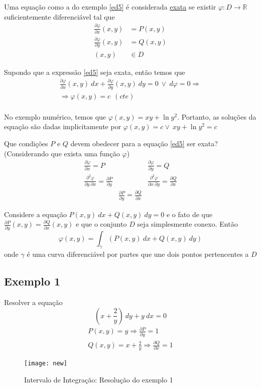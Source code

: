 \documentclass[12pt,openany, letterpaper]{book}
\newcommand{\defini}[3][\mathds{R}]{#2: #3 \rightarrow {#1}}
\newcommand{\DS}{\displaystyle{}}
\begin{document}
{{Uma equação como a do exemplo \ref{ed5} é considerada \underline{exata} se existir $\defini{\varphi}{D}$ suficientemente diferenciável tal que \begin{align*}
    \frac{\partial \varphi}{\partial x}(x,y) &= P(x,y) \\
    \frac{\partial \varphi}{\partial y}(x,y) &= Q(x,y) \\
        (x,y) &\in D
\end{align*}

Supondo que a expressão \ref{ed5} seja exata,  então temos que \begin{align*}
    \frac{\partial \varphi}{\partial x}(x,y) \ dx + \frac{\partial \varphi}{\partial y}(x,y)\ dy = 0 \ \lor \ d\varphi = 0 \Rightarrow \\
    \Rightarrow \varphi(x,y) = c \ \ (cte) \\
\end{align*}

No exemplo numérico, temos que $\varphi(x,y) = xy + \ln y^2$. Portanto, as soluções da equação são dadas implicitamente por $\varphi(x,y) = c \lor \ xy + \ln y^2 = c$

Que condições $P$ e $Q$ devem obedecer para a equação \ref{ed5} ser exata? (Considerando que exista uma função $\varphi$) \begin{align*}
    \frac{\partial \varphi}{\partial x} = P & \ & \frac{\partial \varphi}{\partial y} = Q \\
    \frac{\partial^2 \varphi}{\partial y \ \partial x} = \frac{\partial P}{\partial y} &  \  & \frac{\partial^2 \varphi}{\partial x \ \partial y} = \frac{\partial Q}{\partial x} \\
    \ & \frac{\partial P}{\partial y} = \frac{\partial Q}{\partial x} & \
\end{align*}

Considere a equação $P(x,y) \ dx + Q (x,y) \ dy = 0$ e o fato de que $\DS{\frac{\partial P}{\partial y}(x,y) = \frac{\partial Q}{\partial x}(x,y)}$ e que o conjunto $D$ seja simplesmente conexo. Então $$ \varphi(x,y) = \int_\gamma (P(x,y) \ dx + Q(x,y) \ dy) $$ onde $\gamma$ é uma curva diferenciável por partes que une dois pontos pertencentes a $D$

\subsection*{Exemplo 1}{Resolver a equação $$ \left(x + \frac{2}{y}\right) \ dy + y \ dx = 0 $$}
\begin{align*}
    P(x,y) = y \Rightarrow \frac{\partial P}{\partial y} = 1 \\
    Q(x,y) = x + \frac{2}{y} \Rightarrow \frac{\partial Q}{\partial x} = 1
\end{align*}
\begin{figure}
\centering
\texttt{[image: new]}
\caption{Intervalo de Integração: Resolução do exemplo 1}
\label{fig:diff-1}
\end{figure}

}}
\end{document}

